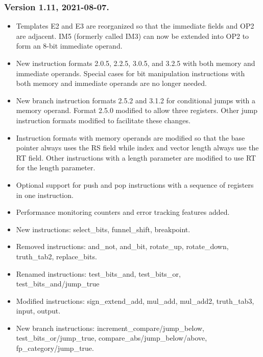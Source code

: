 \documentclass[forwardcom.tex]{subfiles}
\begin{document}
\subsubsection{Version 1.11, 2021-08-07.}

\begin{itemize}
\item Templates E2 and E3 are reorganized so that the immediate fields and OP2 are adjacent. IM5 (formerly called IM3) can now be extended into OP2 to form an 8-bit immediate operand.

\item New instruction formats 2.0.5, 2.2.5, 3.0.5, and 3.2.5 with both memory and immediate operands. Special cases for bit manipulation instructions with both memory and immediate operands are no longer needed.

\item New branch instruction formats 2.5.2 and 3.1.2 for conditional jumps with a memory operand. Format 2.5.0 modified to allow three registers. Other jump instruction formats modified to facilitate these changes.

\item Instruction formats with memory operands are modified so that the base pointer always uses the RS field while index and vector length always use the RT field. Other instructions with a length parameter are modified to use RT for the length parameter.

\item Optional support for push and pop instructions with a sequence of registers in one instruction.

\item Performance monitoring counters and error tracking features added.

\item New instructions: select\_bits, funnel\_shift, breakpoint.

\item Removed instructions: and\_not, and\_bit, rotate\_up, rotate\_down, truth\_tab2, replace\_bits.

\item Renamed instructions: test\_bits\_and, test\_bits\_or, test\_bits\_and/jump\_true

\item Modified instructions: sign\_extend\_add, mul\_add, mul\_add2, truth\_tab3, input, output.

\item New branch instructions: increment\_compare/jump\_below, test\_bits\_or/jump\_true,  
compare\_abs/jump\_below/above, fp\_category/jump\_true.


\end{itemize}
\end{document}
